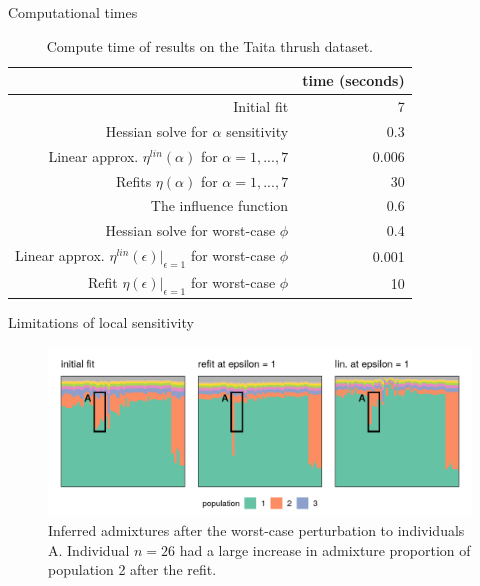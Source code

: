\begin{frame}{Computational times}

\begin{table}[tb]
\centering
\caption*{Compute time of results on the Taita thrush dataset. }
\begin{tabular}{|r|r|}
\hline
    & time (seconds) \\
    \hline
    Initial fit & 7 \\
    \hline
    Hessian solve for $\alpha$ sensitivity & 0.3\\
    Linear approx. $\eta^{lin}(\alpha)$ for $\alpha = 1, ..., 7$ &
        0.006 \\
    Refits $\eta(\alpha)$ for $\alpha = 1, ..., 7$ &
        30 \\
    \hline
    The influence function & 0.6 \\
    Hessian solve for worst-case $\phi$ &
        0.4 \\
    Linear approx. $\eta^{lin}(\epsilon)|_{\epsilon = 1}$
      for worst-case $\phi$ &
        0.001\\
    Refit $\eta(\epsilon)|_{\epsilon = 1}$
      for worst-case $\phi$ &
        10 \\
    \hline
\end{tabular}
\end{table}



\end{frame}



\begin{frame}{Limitations of local sensitivity}
  \begin{figure}[!h]
    \centering
    \includegraphics[width = \textwidth]{./figures/bad_admix_example.png}
    \caption*{Inferred admixtures after the worst-case perturbation
     to individuals A.
     Individual $n = 26$ had a large increase in admixture proportion of
     population 2 after the refit. }
  \end{figure}

\end{frame}

